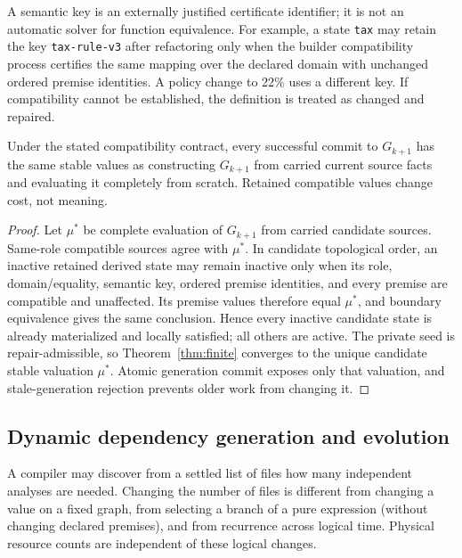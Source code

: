 A semantic key is an externally justified certificate identifier; it is not an automatic solver for function equivalence. For example, a state \texttt{tax} may retain the key \texttt{tax-rule-v3} after refactoring only when the builder compatibility process certifies the same mapping over the declared domain with unchanged ordered premise identities. A policy change to 22\% uses a different key. If compatibility cannot be established, the definition is treated as changed and repaired.

\begin{theorem}\label{thm:graphcommit}
Under the stated compatibility contract, every successful commit to $G_{k+1}$ has the same stable values as constructing $G_{k+1}$ from carried current source facts and evaluating it completely from scratch. Retained compatible values change cost, not meaning.
\end{theorem}
\begin{proof}
Let $\mu^*$ be complete evaluation of $G_{k+1}$ from carried candidate sources. Same-role compatible sources agree with $\mu^*$. In candidate topological order, an inactive retained derived state may remain inactive only when its role, domain/equality, semantic key, ordered premise identities, and every premise are compatible and unaffected. Its premise values therefore equal $\mu^*$, and boundary equivalence gives the same conclusion. Hence every inactive candidate state is already materialized and locally satisfied; all others are active. The private seed is repair-admissible, so Theorem~\ref{thm:finite} converges to the unique candidate stable valuation $\mu^*$. Atomic generation commit exposes only that valuation, and stale-generation rejection prevents older work from changing it.
\end{proof}

\subsection{Dynamic dependency generation and evolution}\label{sec:dynamic-generation}
A compiler may discover from a settled list of files how many independent analyses are needed. Changing the number of files is different from changing a value on a fixed graph, from selecting a branch of a pure expression (without changing declared premises), and from recurrence across logical time. Physical resource counts are independent of these logical changes.

